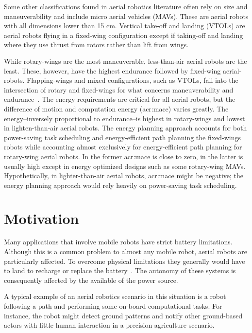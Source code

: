Some other classifications found in aerial robotics literature often rely on size and maneuverability and include micro aerial vehicles (MAVs). These are aerial robots with all dimensions lower than 15 cm. Vertical take-off and landing (VTOLs) are aerial robots flying in a fixed-wing configuration except if taking-off and landing where they use thrust from rotors rather than lift from wings. 

While rotary-wings are the most maneuverable, less-than-air aerial robots are the least. These, however, have the highest endurance followed by fixed-wing aerial-robots. Flapping-wings and mixed configurations, such as VTOLs, fall into the intersection of rotary and fixed-wings for what concerns maneuverability and endurance~\citep{siciliano2016springer}. The energy requirements are critical for all aerial robots, but the difference of motion and computation energy (\Gls{acr:mace}) varies greatly. The energy--inversely proportional to endurance--is highest in rotary-wings and lowest in lighten-than-air aerial robots. The energy planning approach accounts for both power-saving task scheduling and energy-efficient path planning    the fixed-wings robots while accounting almost exclusively for energy-efficient path planning for rotary-wing aerial robots. In the former \Gls{acr:mace} is close to zero, in the latter is usually high except in energy optimized designs such as some rotary-wing MAVs. Hypothetically, in lighter-than-air aerial robots, \Gls{acr:mace} might be negative; the energy planning approach would rely heavily on power-saving task scheduling.


\section{Motivation}

Many applications that involve mobile robots have strict battery limitations. Although this is a common problem to almost any mobile robot, aerial robots are particularly affected. To overcome physical limitations they generally would have to land to recharge or replace the battery~\citep{zamanakos2020energy}. The autonomy of these systems is consequently affected by the available of the power source. 

A typical example of an aerial robotics scenario in this situation is a robot following a path and performing some on-board computational tasks. For instance, the robot might detect ground patterns and notify other ground-based actors with little human interaction in a precision agriculture scenario.

